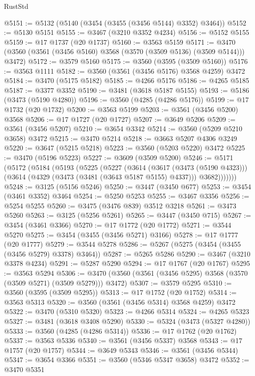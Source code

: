 \begin{lexlean}{RustStd}
\begin{coremodule}
{\begin{coremodule}
{{{{{{{{{{{{{{{{{{{{{{{{{{{{{{{{{{{{{{{{{{{{{@5151 := @5132 (@5140 (@3454 (@3455 (@3456 @5144) @3352) @3464))
@5152 := @5130 @5151
@5155 := @3467 (@3210 @3352 @4234)
@5156 := @5152 @5155
@5159 := @17 @1737 (@20 @1737)
@5160 := @3563 @5159
@5171 := @3470 (@3560 (@3561 (@3456 @5160) @3568 (@3570 (@3509 @5136) (@3509 @5144))) @3472)
@5172 := @3579 @5160
@5175 := @3560 (@3595 (@3509 @5160))
@5176 := @3563 @1111
@5182 := @3560 (@3561 (@3456 @5176) @3568 @4259) @3472
@5184 := @3470 (@5175 @5182)
@5185 := @4266 @5176
@5186 := @4265 @5185
@5187 := @3377 @3352
@5190 := @3481 (@3618 @5187 @5155)
@5193 := @5186 (@3473 (@5190 @4280))
@5196 := @3560 (@4285 (@4286 @5176))
@5199 := @17 @1732 (@20 @1732)
@5200 := @3563 @5199
@5203 := @3561 (@3456 @5200) @3568
@5206 := @17 @1727 (@20 @1727)
@5207 := @3649 @5206
@5209 := @3561 (@3456 @5207)
@5210 := @3654 @3342
@5214 := @3560 (@5209 @5210 @3658) @3472
@5215 := @3470 @5214
@5218 := @3663 @5207 @4306 @3249
@5220 := @3647 (@5215 @5218)
@5223 := @3560 (@5203 @5220) @3472
@5225 := @3470 (@5196 @5223)
@5227 := @3609 (@3509 @5200)
@5246 := @5171
    (@5172
      (@5184
        (@5193
          (@5225
            (@5227
              (@3614
                (@3617 (@3473 (@5190 @4323)))
                (@3614 (@4329 (@3473 (@3481 (@3643 @5187 @5155) @4337))) @3682)))))))
@5248 := @3125 (@5156 @5246)
@5250 := @3447 (@3450 @677)
@5253 := @3454 (@3461 @3352) @3464
@5254 := @5250 @5253
@5255 := @3467 @3356
@5256 := @5254 @5255
@5260 := @3475 (@3476 @839) @3512 @3218
@5261 := @3473 @5260
@5263 := @3125 (@5256 @5261)
@5265 := @3447 (@3450 @715)
@5267 := @3454 (@3461 @3366)
@5270 := @17 @1772 (@20 @1772)
@5271 := @3544 @5270
@5275 := @3454 (@3455 (@3456 @5271) @3166)
@5278 := @17 @1777 (@20 @1777)
@5279 := @3544 @5278
@5286 := @5267 (@5275 (@3454 (@3455 (@3456 @5279) @3378) @3464))
@5287 := @5265 @5286
@5290 := @3467 (@3210 @3378 @4234)
@5291 := @5287 @5290
@5294 := @17 @1767 (@20 @1767)
@5295 := @3563 @5294
@5306 := @3470 (@3560 (@3561 (@3456 @5295) @3568 (@3570 (@3509 @5271) (@3509 @5279))) @3472)
@5307 := @3579 @5295
@5310 := @3560 (@3595 (@3509 @5295))
@5313 := @17 @1752 (@20 @1752)
@5314 := @3563 @5313
@5320 := @3560 (@3561 (@3456 @5314) @3568 @4259) @3472
@5322 := @3470 (@5310 @5320)
@5323 := @4266 @5314
@5324 := @4265 @5323
@5327 := @3481 (@3618 @3408 @5290)
@5330 := @5324 (@3473 (@5327 @4280))
@5333 := @3560 (@4285 (@4286 @5314))
@5336 := @17 @1762 (@20 @1762)
@5337 := @3563 @5336
@5340 := @3561 (@3456 @5337) @3568
@5343 := @17 @1757 (@20 @1757)
@5344 := @3649 @5343
@5346 := @3561 (@3456 @5344)
@5347 := @3654 @3366
@5351 := @3560 (@5346 @5347 @3658) @3472
@5352 := @3470 @5351
}}}}}}}}}}}}}}}}}}}}}}}}}}}}}}}}}}}}}}}}}}}}}
\end{coremodule}}
\end{coremodule}
\end{lexlean}

